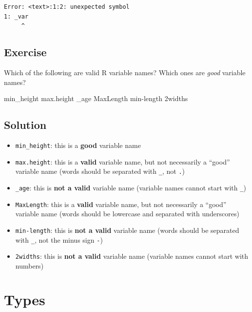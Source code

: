 \documentclass[
  letterpaper,
  DIV=11,
  numbers=noendperiod]{scrreprt}
\newenvironment{Shaded}{\begin{snugshade}}{\end{snugshade}}
\newcommand{\DecValTok}[1]{\textcolor[rgb]{0.68,0.00,0.00}{#1}}
\newcommand{\NormalTok}[1]{\textcolor[rgb]{0.00,0.23,0.31}{#1}}
\newcommand{\SpecialCharTok}[1]{\textcolor[rgb]{0.37,0.37,0.37}{#1}}
\begin{document}
\begin{verbatim}
Error: <text>:1:2: unexpected symbol
1: _var
     ^
\end{verbatim}

\section{Exercise}

Which of the following are valid R variable names? Which ones are
\emph{good} variable names?

\begin{Shaded}
\begin{Highlighting}[]
\NormalTok{min\_height}
\NormalTok{max.height}
\NormalTok{\_age}
\NormalTok{MaxLength}
\NormalTok{min}\SpecialCharTok{{-}}\NormalTok{length}
\DecValTok{2}\NormalTok{widths}
\end{Highlighting}
\end{Shaded}

\section{Solution}

\begin{itemize}
\item
  \texttt{min\_height}: this is a \textbf{good} variable name
\item
  \texttt{max.height}: this is a \textbf{valid} variable name, but not
  necessarily a ``good'' variable name (words should be separated with
  \texttt{\_}, not \texttt{.})
\item
  \texttt{\_age}: this is \textbf{not a valid} variable name (variable
  names cannot start with \texttt{\_})
\item
  \texttt{MaxLength}: this is a \textbf{valid} variable name, but not
  necessarily a ``good'' variable name (words should be lowercase and
  separated with underscores)
\item
  \texttt{min-length}: this is \textbf{not a valid} variable name (words
  should be separated with \texttt{\_}, not the minus sign \texttt{-})
\item
  \texttt{2widths}: this is \textbf{not a valid} variable name (variable
  names cannot start with numbers)
\end{itemize}

\chapter{Types}\label{types}
\end{document}
